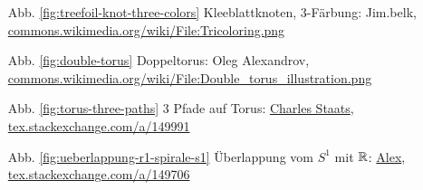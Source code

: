 \begin{itemize}
    \item[Abb. \ref{fig:treefoil-knot-three-colors}] Kleeblattknoten, 3-Färbung: Jim.belk, \href{https://commons.wikimedia.org/wiki/File:Tricoloring.png}{commons.wikimedia.org/wiki/File:Tricoloring.png}
    \item[Abb. \ref{fig:double-torus}] Doppeltorus: Oleg Alexandrov, \href{https://commons.wikimedia.org/wiki/File:Double_torus_illustration.png}{commons.wikimedia.org/wiki/File:Double\_torus\_illustration.png}
    \item[Abb. \ref{fig:torus-three-paths}] 3 Pfade auf Torus: \href{http://tex.stackexchange.com/users/484/charles-staats}{Charles Staats}, \href{http://tex.stackexchange.com/a/149991/5645}{tex.stackexchange.com/a/149991}
    \item[Abb. \ref{fig:ueberlappung-r1-spirale-s1}] Überlappung vom $S^1$ mit $\mathbb{R}$: \href{http://tex.stackexchange.com/users/22467/alex}{Alex}, \href{http://tex.stackexchange.com/a/149706/5645}{tex.stackexchange.com/a/149706}
\end{itemize}
